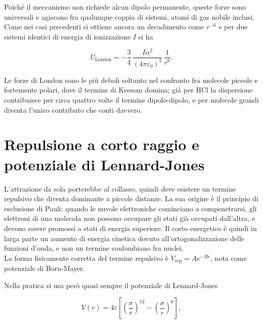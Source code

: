 Poiché il meccanismo non richiede alcun dipolo permanente, queste forze sono universali e agiscono fra qualunque coppia di sistemi, atomi di gas nobile inclusi.\\

Come nei casi precedenti si ottiene ancora un decadimento come $r^{-6}$ e per due sistemi identici di energia di ionizzazione $I$ si ha

\begin{equation}
    U_{\text{London}} = -\frac{3}{4}\,\frac{I\alpha^2}{(4\pi\varepsilon_0)^2}\,\frac{1}{r^6}.
    \label{eq:london}
\end{equation}

Le forze di London sono le più deboli soltanto nel confronto fra molecole piccole e fortemente polari, dove il termine di Keesom domina; già per $\mathrm{HCl}$ la dispersione contribuisce per circa quattro volte il termine dipolo-dipolo, e per molecole grandi diventa l'unico contributo che conti davvero.

\section{Repulsione a corto raggio e potenziale di Lennard-Jones}

L'attrazione da sola porterebbe al collasso, quindi deve esistere un termine repulsivo che diventa dominante a piccole distanze.
La sua origine è il principio di esclusione di Pauli: quando le nuvole elettroniche cominciano a compenetrarsi, gli elettroni di una molecola non possono occupare gli stati già occupati dall'altra, e devono essere promossi a stati di energia superiore.
Il costo energetico è quindi in larga parte un aumento di energia cinetica dovuto all'ortogonalizzazione delle funzioni d'onda, e non un termine coulombiano fra nuclei.\\

La forma fisicamente corretta del termine repulsivo è $V_{\text{rep}} = Ae^{-Br}$, nota come potenziale di Born-Mayer.\\

\newpage

Nella pratica si usa però quasi sempre il potenziale di Lennard-Jones

\begin{equation}
    V(r) = 4\varepsilon\left[\left(\frac{\sigma}{r}\right)^{12} - \left(\frac{\sigma}{r}\right)^{6}\right],
    \label{eq:lennardjones}
\end{equation}

